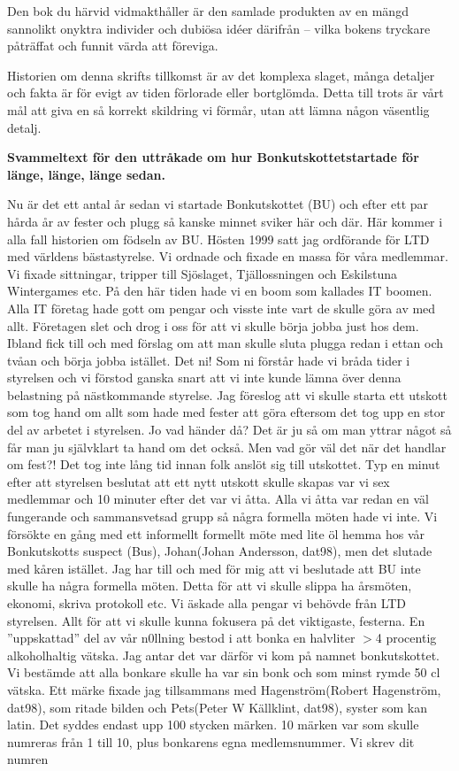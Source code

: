 

Den bok du härvid vidmakthåller är den samlade produkten av en mängd sannolikt onyktra individer och dubiösa idéer därifrån -- vilka bokens tryckare påträffat och funnit värda att föreviga.

Historien om denna skrifts tillkomst är av det komplexa slaget, många detaljer och fakta är för evigt av tiden förlorade eller bortglömda. Detta till trots är vårt mål att giva en så korrekt skildring vi förmår, utan att lämna någon väsentlig detalj.

\textbf{Svammeltext för den uttråkade om hur Bonkutskottetstartade för länge, länge, länge sedan.}

Nu är det ett antal år sedan vi startade Bonkutskottet (BU) och efter ett par hårda år av fester och plugg så kanske minnet sviker här och där. Här kommer i alla fall historien om födseln av BU. Hösten 1999 satt jag ordförande för LTD med världens bästastyrelse. Vi ordnade och fixade en massa för våra medlemmar. Vi fixade sittningar, tripper till Sjöslaget, Tjällossningen och Eskilstuna Wintergames etc. På den här tiden hade vi en boom som kallades IT boomen. Alla IT företag hade gott om pengar och visste inte vart de skulle göra av med allt. Företagen slet och drog i oss för att vi skulle börja jobba just hos dem. Ibland fick till och med förslag om att man skulle sluta plugga redan i ettan och tvåan och börja jobba istället. Det ni! Som ni förstår hade vi bråda tider i styrelsen och vi förstod ganska snart att vi inte kunde lämna över denna belastning på nästkommande styrelse. Jag föreslog att vi skulle starta ett utskott som tog hand om allt som hade med fester att göra eftersom det tog upp en stor del av arbetet i styrelsen. Jo vad händer då? Det är ju så om man yttrar något så får man ju självklart ta hand om det också. Men vad gör väl det när det handlar om fest?! Det tog inte lång tid innan folk anslöt sig till utskottet. Typ en minut efter att styrelsen beslutat att ett nytt utskott skulle skapas var vi sex medlemmar och 10 minuter efter det var vi åtta. Alla vi åtta var redan en väl fungerande och sammansvetsad grupp så några formella möten hade vi inte. Vi försökte en gång med ett informellt formellt möte med lite öl hemma hos vår Bonkutskotts suspect (Bus), Johan(Johan Andersson, dat98), men det slutade med kåren istället. Jag har till och med för mig att vi beslutade att BU inte skulle ha några formella möten. Detta för att vi skulle slippa ha årsmöten, ekonomi, skriva protokoll etc. Vi äskade alla pengar vi behövde från LTD styrelsen. Allt för att vi skulle kunna fokusera på det viktigaste, festerna. En ”uppskattad” del av vår n0llning bestod i att bonka en halvliter \(>\)4 procentig alkoholhaltig vätska. Jag antar det var därför vi kom på namnet bonkutskottet. Vi bestämde att alla bonkare skulle ha var sin bonk och som minst rymde 50 cl vätska. Ett märke fixade jag tillsammans med Hagenström(Robert Hagenström, dat98), som ritade bilden och Pets(Peter W Källklint, dat98), syster som kan latin. Det syddes endast upp 100 stycken märken. 10 märken var som skulle numreras från 1 till 10, plus bonkarens egna medlemsnummer. Vi skrev dit numren 